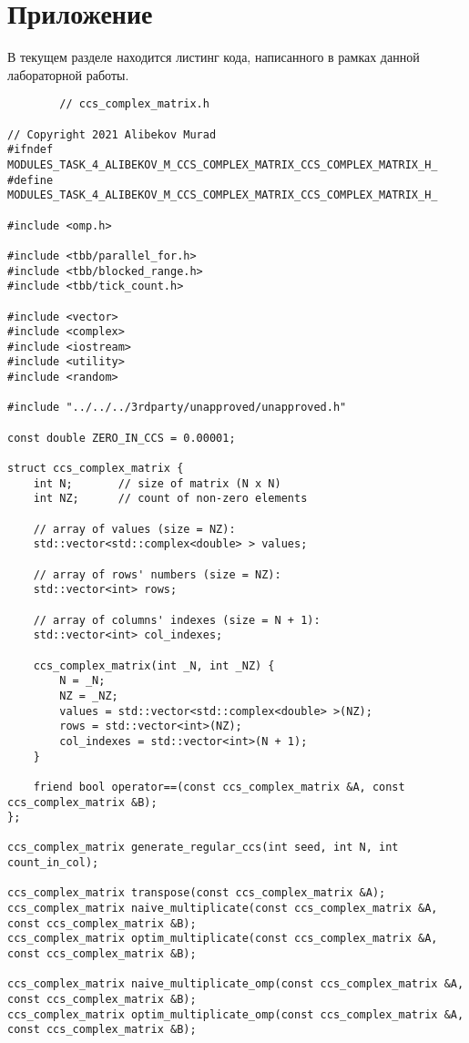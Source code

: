 \documentclass{report}
\begin{document}
	\section*{Приложение}
	\par В текущем разделе находится листинг кода, написанного в рамках данной лабораторной работы.
	\begin{lstlisting}
		// ccs_complex_matrix.h
		
// Copyright 2021 Alibekov Murad
#ifndef MODULES_TASK_4_ALIBEKOV_M_CCS_COMPLEX_MATRIX_CCS_COMPLEX_MATRIX_H_
#define MODULES_TASK_4_ALIBEKOV_M_CCS_COMPLEX_MATRIX_CCS_COMPLEX_MATRIX_H_

#include <omp.h>

#include <tbb/parallel_for.h>
#include <tbb/blocked_range.h>
#include <tbb/tick_count.h>

#include <vector>
#include <complex>
#include <iostream>
#include <utility>
#include <random>

#include "../../../3rdparty/unapproved/unapproved.h"

const double ZERO_IN_CCS = 0.00001;

struct ccs_complex_matrix {
    int N;       // size of matrix (N x N)
    int NZ;      // count of non-zero elements

    // array of values (size = NZ):
    std::vector<std::complex<double> > values;

    // array of rows' numbers (size = NZ):
    std::vector<int> rows;

    // array of columns' indexes (size = N + 1):
    std::vector<int> col_indexes;

    ccs_complex_matrix(int _N, int _NZ) {
        N = _N;
        NZ = _NZ;
        values = std::vector<std::complex<double> >(NZ);
        rows = std::vector<int>(NZ);
        col_indexes = std::vector<int>(N + 1);
    }

    friend bool operator==(const ccs_complex_matrix &A, const ccs_complex_matrix &B);
};

ccs_complex_matrix generate_regular_ccs(int seed, int N, int count_in_col);

ccs_complex_matrix transpose(const ccs_complex_matrix &A);
ccs_complex_matrix naive_multiplicate(const ccs_complex_matrix &A, const ccs_complex_matrix &B);
ccs_complex_matrix optim_multiplicate(const ccs_complex_matrix &A, const ccs_complex_matrix &B);

ccs_complex_matrix naive_multiplicate_omp(const ccs_complex_matrix &A, const ccs_complex_matrix &B);
ccs_complex_matrix optim_multiplicate_omp(const ccs_complex_matrix &A, const ccs_complex_matrix &B);


\end{lstlisting}
\end{document}
